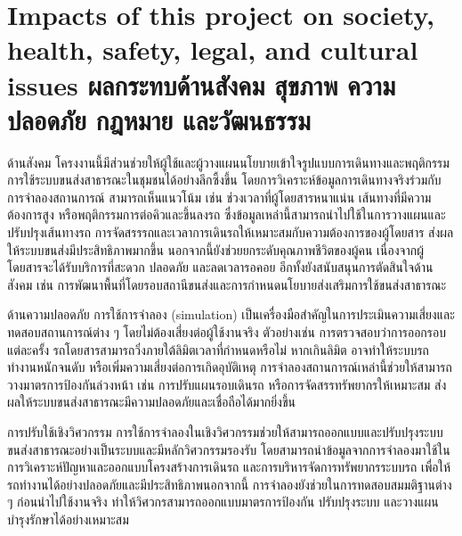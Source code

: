\section{\ifenglish%
Impacts of this project on society, health, safety, legal, and cultural issues
\else%
ผลกระทบด้านสังคม สุขภาพ ความปลอดภัย กฎหมาย และวัฒนธรรม
\fi}
\begin{mypara}
    \indent ด้านสังคม โครงงานนี้มีส่วนช่วยให้ผู้ใช้และผู้วางแผนนโยบายเข้าใจรูปแบบการเดินทางและพฤติกรรมการใช้ระบบขนส่งสาธารณะในชุมชนได้อย่างลึกซึ้งขึ้น โดยการวิเคราะห์ข้อมูลการเดินทางจริงร่วมกับการจำลองสถานการณ์ สามารถเห็นแนวโน้ม 
    เช่น ช่วงเวลาที่ผู้โดยสารหนาแน่น เส้นทางที่มีความต้องการสูง หรือพฤติกรรมการต่อคิวและขึ้นลงรถ ซึ่งข้อมูลเหล่านี้สามารถนำไปใช้ในการวางแผนและปรับปรุงเส้นทางรถ การจัดสรรรถและเวลาการเดินรถให้เหมาะสมกับความต้องการของผู้โดยสาร 
    ส่งผลให้ระบบขนส่งมีประสิทธิภาพมากขึ้น นอกจากนี้ยังช่วยยกระดับคุณภาพชีวิตของผู้คน เนื่องจากผู้โดยสารจะได้รับบริการที่สะดวก ปลอดภัย และลดเวลารอคอย อีกทั้งยังสนับสนุนการตัดสินใจด้านสังคม เช่น 
    การพัฒนาพื้นที่โดยรอบสถานีขนส่งและการกำหนดนโยบายส่งเสริมการใช้ขนส่งสาธารณะ

    \indent ด้านความปลอดภัย การใช้การจำลอง (simulation) เป็นเครื่องมือสำคัญในการประเมินความเสี่ยงและทดสอบสถานการณ์ต่าง ๆ โดยไม่ต้องเสี่ยงต่อผู้ใช้งานจริง ตัวอย่างเช่น การตรวจสอบว่าการออกรอบแต่ละครั้ง 
    รถโดยสารสามารถวิ่งภายใต้ลิมิตเวลาที่กำหนดหรือไม่ หากเกินลิมิต อาจทำให้ระบบรถทำงานหนักจนดับ หรือเพิ่มความเสี่ยงต่อการเกิดอุบัติเหตุ การจำลองสถานการณ์เหล่านี้ช่วยให้สามารถวางมาตรการป้องกันล่วงหน้า 
    เช่น การปรับแผนรอบเดินรถ หรือการจัดสรรทรัพยากรให้เหมาะสม ส่งผลให้ระบบขนส่งสาธารณะมีความปลอดภัยและเชื่อถือได้มากยิ่งขึ้น

    \indent การปรับใช้เชิงวิศวกรรม การใช้การจำลองในเชิงวิศวกรรมช่วยให้สามารถออกแบบและปรับปรุงระบบขนส่งสาธารณะอย่างเป็นระบบและมีหลักวิศวกรรมรองรับ โดยสามารถนำข้อมูลจากการจำลองมาใช้ในการวิเคราะห์ปัญหาและออกแบบโครงสร้างการเดินรถ 
    และการบริหารจัดการทรัพยากรระบบรถ เพื่อให้รถทำงานได้อย่างปลอดภัยและมีประสิทธิภาพนอกจากนี้ การจำลองยังช่วยในการทดสอบสมมติฐานต่าง ๆ ก่อนนำไปใช้งานจริง ทำให้วิศวกรสามารถออกแบบมาตรการป้องกัน ปรับปรุงระบบ และวางแผนบำรุงรักษาได้อย่างเหมาะสม
\end{mypara}

